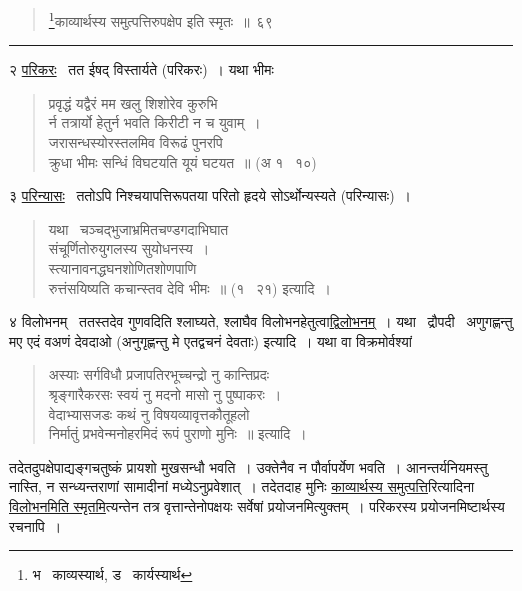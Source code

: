 \documentclass[11pt, openany]{book}
\begin{document}
\begin{quote}
{\na \renewcommand{\thefootnote}{1}\footnote{भ \textendash\ काव्यस्यार्थ, ड \textendash\ कार्यस्यार्थ}काव्यार्थस्य समुत्पत्तिरुपक्षेप इति स्मृतः~॥~६९}
\end{quote}

\hrule

\vspace{2mm}
२ \underline{परिकरः} \textendash\ तत ईषद् विस्तार्यते (परिकरः)~। यथा भीमः\textendash

\begin{quote}
{\qt प्रवृद्धं यद्वैरं मम खलु शिशोरेव कुरुभि \textendash\ \\
र्न तत्रार्यो हेतुर्न भवति किरीटी न च युवाम्~।\\
जरासन्धस्योरस्तलमिव विरूढं पुनरपि\\
क्रुधा भीमः सन्धिं विघटयति यूयं घटयत~॥} (अ १ \textendash\ १०)
\end{quote}

३ \underline{परिन्यासः} \textendash\ ततोऽपि निश्चयापत्तिरूपतया परितो हृदये सोऽर्थोन्यस्यते (परिन्यासः)~।

\begin{quote}
यथा \textendash\ {\qt चञ्चद्भुजाभ्रमितचण्डगदाभिघात\textendash \\
संचूर्णितोरुयुगलस्य सुयोधनस्य~।\\
स्त्यानावनद्धघनशोणितशोणपाणि\textendash \\
रुत्तंसयिष्यति कचान्स्तव देवि भीमः~॥} (१ \textendash\ २१) इत्यादि~।
\end{quote}

४ विलोभनम् \textendash\ ततस्तदेव गुणवदिति श्लाघ्यते, श्लाघैव विलोभनहेतुत्वा\underline{द्विलोभनम्}~। यथा \textendash\ द्रौपदी \textendash\ अणुगह्णन्तु मए एदं वअणं देवदाओ (अनुगृह्णन्तु मे एतद्वचनं देवताः) इत्यादि~। यथा वा विक्रमोर्वश्यां \textendash

\begin{quote}
{\qt अस्याः सर्गविधौ प्रजापतिरभूच्चन्द्रो नु कान्तिप्रदः\\
श्रृङ्गारैकरसः स्वयं नु मदनो मासो नु पुष्पाकरः~।\\
वेदाभ्यासजडः कथं नु विषयव्यावृत्तकौतूहलो\\
निर्मातुं प्रभवेन्मनोहरमिदं रूपं पुराणो मुनिः~॥} इत्यादि~।
\end{quote}

\noindent
तदेतदुपक्षेपाद्यङ्गचतुष्कं प्रायशो मुखसन्धौ भवति~। उक्तेनैव न पौर्वापर्येण भवति~। आनन्तर्यनियमस्तु नास्ति, न सन्ध्यन्तराणां सामादीनां मध्येऽनुप्रवेशात्~। तदेतदाह मुनिः \underline{काव्यार्थस्य समुत्पत्ति}रित्यादिना \underline{विलोभनमिति स्मृतमि}त्यन्तेन तत्र वृत्तान्तेनोपक्षयः सर्वेषां प्रयोजनमित्युक्तम्~। परिकरस्य प्रयोजनमिष्टार्थस्य रचनापि~।
\end{document}
